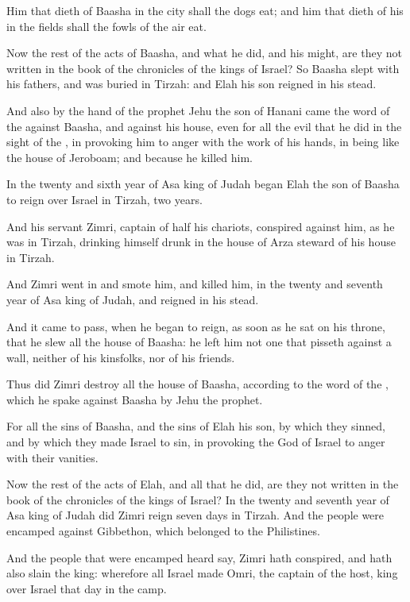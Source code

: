 \Verse Him that dieth of Baasha in the city shall the dogs eat; and him that dieth of his in the fields shall the fowls of the air eat.

\Verse Now the rest of the acts of Baasha, and what he did, and his might, are they not written in the book of the chronicles of the kings of Israel?  \Verse So Baasha slept with his fathers, and was buried in Tirzah: and Elah his son reigned in his stead.

\Verse And also by the hand of the prophet Jehu the son of Hanani came the word of the \LORD against Baasha, and against his house, even for all the evil that he did in the sight of the \LORD, in provoking him to anger with the work of his hands, in being like the house of Jeroboam; and because he killed him.

\Verse In the twenty and sixth year of Asa king of Judah began Elah the son of Baasha to reign over Israel in Tirzah, two years.

\Verse And his servant Zimri, captain of half his chariots, conspired against him, as he was in Tirzah, drinking himself drunk in the house of Arza steward of his house in Tirzah.

\Verse And Zimri went in and smote him, and killed him, in the twenty and seventh year of Asa king of Judah, and reigned in his stead.

\Verse And it came to pass, when he began to reign, as soon as he sat on his throne, that he slew all the house of Baasha: he left him not one that pisseth against a wall, neither of his kinsfolks, nor of his friends.

\Verse Thus did Zimri destroy all the house of Baasha, according to the word of the \LORD, which he spake against Baasha by Jehu the prophet.

\Verse For all the sins of Baasha, and the sins of Elah his son, by which they sinned, and by which they made Israel to sin, in provoking the \LORD God of Israel to anger with their vanities.

\Verse Now the rest of the acts of Elah, and all that he did, are they not written in the book of the chronicles of the kings of Israel?  \Verse In the twenty and seventh year of Asa king of Judah did Zimri reign seven days in Tirzah. And the people were encamped against Gibbethon, which belonged to the Philistines.

\Verse And the people that were encamped heard say, Zimri hath conspired, and hath also slain the king: wherefore all Israel made Omri, the captain of the host, king over Israel that day in the camp.

